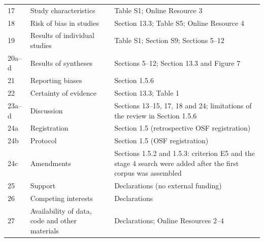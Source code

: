 \documentclass[10pt,a4paper]{article}
\begin{document}
\begin{longtable}{@{}P{1.2cm}P{4.6cm}P{10.6cm}@{}}
17 & Study characteristics & Table S1; Online Resource 3 \\
18 & Risk of bias in studies & Section 13.3; Table S5; Online Resource 4 \\
19 & Results of individual studies & Table S1; Section S9; Sections 5--12 \\
20a--d & Results of syntheses & Sections 5--12; Section 13.3 and Figure 7 \\
21 & Reporting biases & Section 1.5.6 \\
22 & Certainty of evidence & Section 13.3; Table 1 \\
23a--d & Discussion & Sections 13--15, 17, 18 and 24; limitations of the review in Section 1.5.6 \\
24a & Registration & Section 1.5 (retrospective OSF registration) \\
24b & Protocol & Section 1.5 (OSF registration) \\
24c & Amendments & Sections 1.5.2 and 1.5.3: criterion E5 and the stage 4 search were added after the first corpus was assembled \\
25 & Support & Declarations (no external funding) \\
26 & Competing interests & Declarations \\
27 & Availability of data, code and other materials & Declarations; Online Resources 2--4 \\
\end{longtable}
\end{document}
